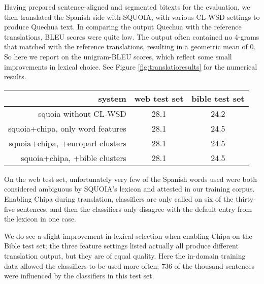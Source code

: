 Having prepared sentence-aligned and segmented bitexts for the evaluation,
we then translated the Spanish side with SQUOIA, with various CL-WSD settings
to produce Quechua text. In comparing the output Quechua with the reference
translations, BLEU scores were quite low. The output often contained no 4-grams
that matched with the reference translations, resulting in a geometric mean of
0. So here we report on the unigram-BLEU scores, which reflect some small
improvements in lexical choice.
See Figure \ref{fig:translatioresults} for the numerical results.

\begin{figure*}[t!]
  \begin{center}
  \begin{tabular}{|r|c|c|}
    \hline
    system                           & web test set & bible test set  \\
    \hline
    squoia without CL-WSD            & 28.1         & 24.2            \\
    squoia+chipa, only word features & 28.1         & 24.5            \\
    squoia+chipa, +europarl clusters & 28.1         & 24.5            \\
    squoia+chipa, +bible    clusters & 28.1         & 24.5            \\
    \hline
  \end{tabular}
  \end{center}
  \caption{BLEU-1 scores (modified unigram precision) for the various CL-WSD
  settings of SQUOIA on the two different Spanish-Quechua test sets.}
\label{fig:translatioresults}
\end{figure*}

On the web test set, unfortunately very few of the Spanish words used were both
considered ambiguous by SQUOIA's lexicon and attested in our training corpus.
Enabling Chipa during translation, classifiers are only called on six of the
thirty-five sentences, and then the classifiers only disagree with the default
entry from the lexicon in one case.

We do see a slight improvement in lexical selection when enabling Chipa on the
Bible test set; the three feature settings listed actually all produce
different translation output, but they are of equal quality. Here the in-domain
training data allowed the classifiers to be used more often; 736 of the
thousand sentences were influenced by the classifiers in this test set.

